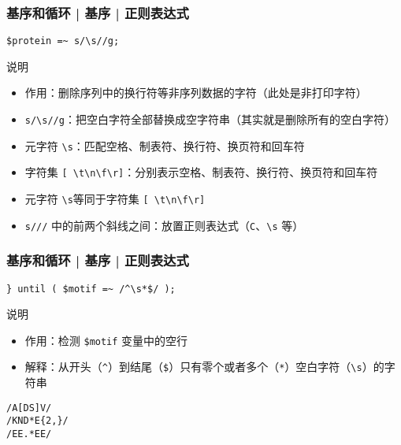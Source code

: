 \begin{frame}[fragile]
  \frametitle{基序和循环 | 基序 | \alert{正则表达式}}
\begin{lstlisting}
$protein =~ s/\s//g;
\end{lstlisting}
\pause
  \begin{block}{说明}
    \begin{itemize}
      \item 作用：删除序列中的换行符等非序列数据的字符（此处是非打印字符）
      \item \verb|s/\s//g|：把空白字符全部替换成空字符串（其实就是删除所有的空白字符）
      \item 元字符 \verb|\s|：匹配空格、制表符、换行符、换页符和回车符
      \item 字符集 \verb|[ \t\n\f\r]|：分别表示空格、制表符、换行符、换页符和回车符
      \item 元字符 \verb|\s|等同于字符集 \verb|[ \t\n\f\r]|
      \item \verb|s///| 中的前两个斜线之间：放置正则表达式（\verb|C|、\verb|\s| 等）
    \end{itemize}
  \end{block}
\end{frame}

\begin{frame}[fragile]
  \frametitle{基序和循环 | 基序 | \alert{正则表达式}}
\begin{lstlisting}
} until ( $motif =~ /^\s*$/ );
\end{lstlisting}
\pause
\begin{block}{说明}
  \begin{itemize}
    \item 作用：检测 \verb|$motif| 变量中的空行
    \item 解释：从开头（\verb|^|）到结尾（\verb|$|）只有零个或者多个（\verb|*|）空白字符（\verb|\s|）的字符串
  \end{itemize}
\end{block}
\pause
\begin{lstlisting}
/A[DS]V/
/KND*E{2,}/
/EE.*EE/
\end{lstlisting}
\end{frame}

